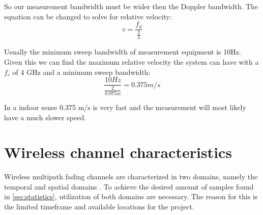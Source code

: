 So our measurement bandwidth must be wider then the Doppler bandwidth. The equation can be changed to solve for relative velocity:
\begin{equation}
v = \frac{f_d}{\frac{2}{\lambda}} 
\end{equation}

Usually the minimum sweep bandwidth of measurement equipment is 10Hz. Given this we can find the maximum relative velocity the system can have with a $f_c$ of 4 GHz and a minimum sweep bandwidth:
\begin{equation}
\frac{10Hz}{\frac{2}{0.075m}} = 0.375 m/s
\label{min_vel}
\end{equation}

In a indoor sense 0.375 m/s is very fast and the measurement will most likely have a much slower speed.

\section{Wireless channel characteristics}


Wireless multipath fading channels are characterized in two domains, namely the temporal and spatial domains \citep[p. 40-42]{stochasticWirelessChan}. To achieve the desired amount of samples found in \autoref{sec:statistics}, utilization of both domains are necessary. The reason for this is the limited timeframe and available locations for the project.

